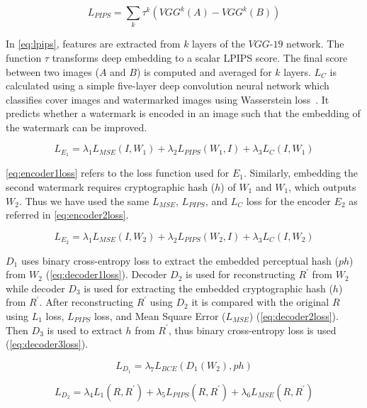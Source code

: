 \documentclass[acmsmall, nonacm]{acmart}
\begin{document}
\begin{equation}\label{eq:lpips}
  L_{PIPS} = \sum_{k} \tau^k (VGG^k (A) - VGG^k (B))
\end{equation}

In \autoref{eq:lpips}, features are extracted from $k$ layers of the $VGG$-$19$ network. The function  $\tau$ transforms deep embedding to a scalar LPIPS score. The final score between two images ($A$ and $B$) is computed and averaged for $k$ layers. {\em $L_C$} is calculated using a simple five-layer deep convolution neural network which classifies cover images and watermarked images using  Wasserstein loss~\cite{wass}.  It predicts whether a watermark is encoded in an image such that the embedding of the watermark can be improved.

\begin{equation}\label{eq:encoder1loss}
  L_{E_1} = \lambda_1 L_{MSE}(I, W_1) + \lambda_2 L_{PIPS}(W_1, I) + \lambda_3 L_C(I, W_1)
\end{equation}

\autoref{eq:encoder1loss} refers to the loss function used for $E_1$. Similarly, embedding the second watermark requires cryptographic hash ($h$) of $W_1$ and $W_1$, which outputs $W_2$. Thus we have used the same  $L_{MSE}$, $L_{PIPS}$, and $L_C$ loss for the encoder $E_2$ as referred in \autoref{eq:encoder2loss}.

\begin{equation}\label{eq:encoder2loss}
  L_{E_2} = \lambda_1 L_{MSE}(I, W_2) + \lambda_2 L_{PIPS}(W_2, I) + \lambda_3 L_C(I, W_2)
\end{equation}

$D_1$ uses binary cross-entropy loss to extract the embedded perceptual hash ($ph$) from $W_2$ (\autoref{eq:decoder1loss}). Decoder $D_2$ is used for reconstructing  $R^{\prime}$ from $W_2$ while decoder $D_3$ is used for extracting the embedded cryptographic hash ($h$) from $R^{\prime}$. After reconstructing  $R^{\prime}$ using $D_2$ it is compared with the original $R$ using $L_1$ loss, {$L_{PIPS}$} loss, and Mean Square Error ($L_{MSE}$) (\autoref{eq:decoder2loss}). Then $D_3$ is used to extract $h$ from $R^{\prime}$,  thus binary cross-entropy loss is used (\autoref{eq:decoder3loss}).

\begin{equation}\label{eq:decoder1loss}
  L_{D_1} = \lambda_7 L_{BCE}(D_1(W_2),ph)
\end{equation}

\begin{equation}\label{eq:decoder2loss}
  L_{D_2} = \lambda_4 L_1(R , R^{\prime}) +  \lambda_5 L_{PIPS}(R , R^{\prime}) + \lambda_ 6 L_{MSE}(R , R^{\prime})
\end{equation}
\end{document}
